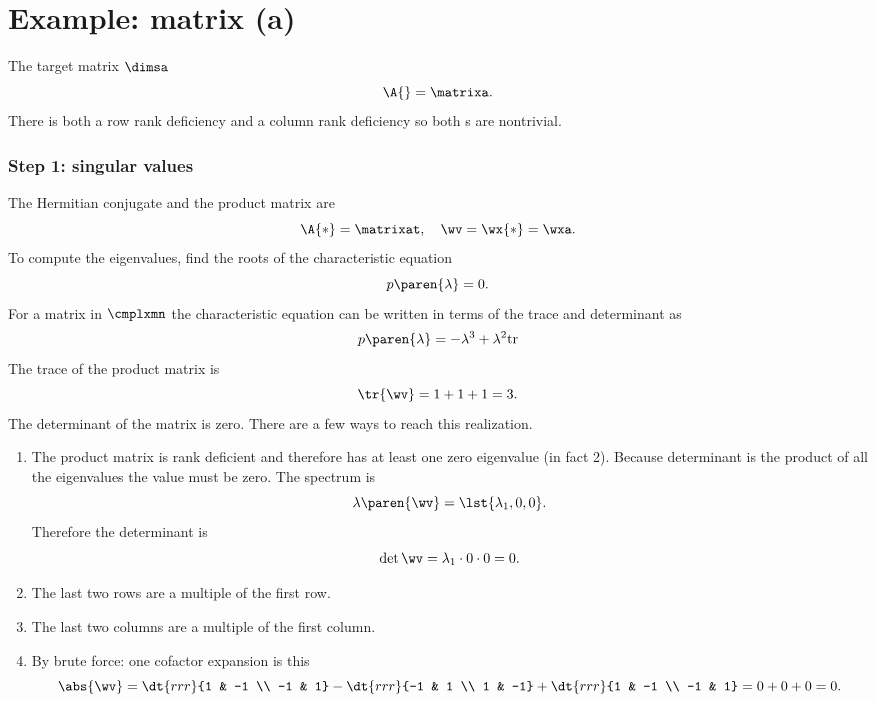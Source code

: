 \section{Example: matrix (a)}
\label{sec:svd I:a}
The target matrix $\dimsa$
\begin{equation}
  \A{} = \matrixa.
\end{equation}
There is both a row rank deficiency and a column rank deficiency so both \ns s are nontrivial.

\subsubsection{Step 1: singular values}
The Hermitian conjugate and the product matrix are
\begin{equation}
  \A{*} = \matrixat, \quad \wv = \wx{*} = \wxa.
\end{equation}
To compute the eigenvalues, find the roots of the characteristic equation
\begin{equation}
  p\paren{\lambda} = 0. 
\end{equation}
For a matrix in $\cmplxmn$ the characteristic equation can be written in terms of the trace and determinant as
\begin{equation}
  p\paren{\lambda} = -\lambda^{3} + \lambda^{2} \text{tr}
\end{equation}
The trace of the product matrix is
\begin{equation}
  \tr{ \wv }  = 1+1+1 = 3.
\end{equation}
The determinant of the matrix is zero. There are a few ways to reach this realization.
\begin{enumerate}
%
  \item The product matrix is rank deficient and therefore has at least one zero eigenvalue (in fact 2). Because determinant is the product of all the eigenvalues the value must be zero. The spectrum is
\begin{equation}
  \lambda \paren{\wv} = \lst{ \lambda_{1}, 0, 0 }.
\end{equation}
Therefore the determinant is
\begin{equation}
  \det \wv = \lambda_{1} \cdot 0 \cdot 0 = 0.
\end{equation}
%
  \item The last two rows are a multiple of the first row. 
%
  \item The last two columns are a multiple of the first column. 
%
  \item By brute force: one cofactor expansion is this
\begin{equation}
  \abs{\wv} = \dt{rrr}{1 & -1 \\ -1 & 1} - \dt{rrr}{-1 & 1 \\ 1 & -1} + \dt{rrr}{1 & -1 \\ -1 & 1} = 0 + 0 + 0 = 0.
\end{equation}
%
\end{enumerate}

